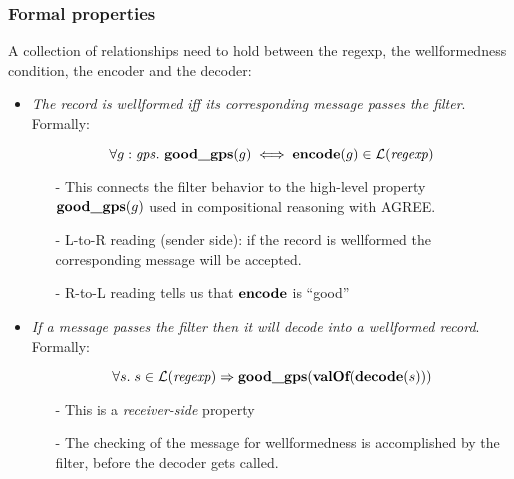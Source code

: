 \documentclass{beamer}
\newcommand{\imp}{\Rightarrow}
\newcommand{\konst}[1]{\ensuremath{\mbox{\bf{#1}}}}
\newcommand{\Lang}[1]{\ensuremath{{\cal L}({#1})}}
\begin{document}
\begin{frame}[allowframebreaks]\frametitle{Formal properties}

A collection of relationships need to hold between the regexp, the
wellformedness condition, the encoder and the decoder:

\vspace*{5mm}

\begin{itemize}

\item \textit{The record is wellformed iff its corresponding message passes the filter}.
Formally:

\[ \forall g : \mathit{gps}.\ \konst{good\_gps}(g) 
  \iff \konst{encode}(g) \in \Lang{\mathit{regexp}}
\]

\begin{itemize}

\item[-]  This connects the filter behavior to the high-level property
$\konst{good\_gps}(g)$ used in compositional reasoning with AGREE.
  
\vspace*{3mm}

\item[-] L-to-R reading (sender side): if the record is wellformed the
  corresponding message will be accepted.

\vspace*{3mm}

\item[-] R-to-L reading tells us that \konst{encode} is ``good'' 

\end{itemize}

\framebreak

\item \textit{If a message passes the filter then it will decode into a wellformed record}.
Formally:

\[ \forall s.\; s \in \Lang{\mathit{regexp}}
   \imp \konst{good\_gps}(\konst{valOf}(\konst{decode}(s))) 
\]

\begin{itemize}

\item[-] This is a \emph{receiver-side} property

\vspace*{3mm}
  
\item[-] The checking of the message for wellformedness is
  accomplished by the filter, before the decoder gets called.


\end{itemize}
\end{itemize}
\end{frame}
\end{document}
